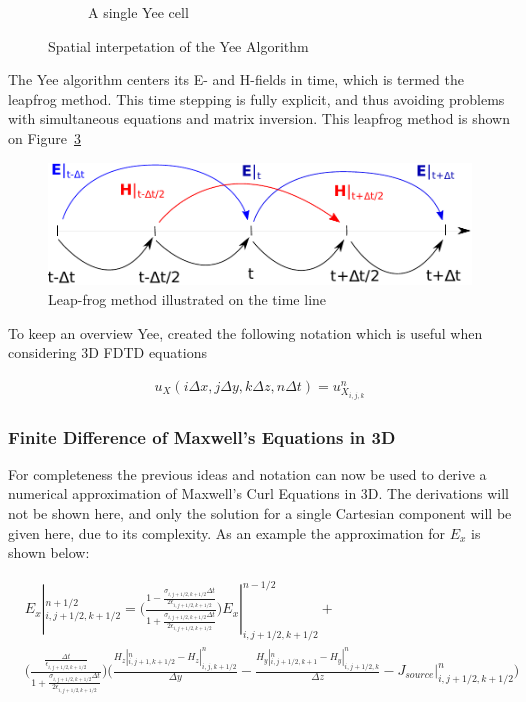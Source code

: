 \begin{figure}
\begin{subfigure}[b]{0.49\textwidth}
        \caption{A single Yee cell}
        \label{fig:yee-cell}
    \end{subfigure}
    \caption{Spatial interpetation of the Yee Algorithm}
    \label{fig:space-yee-algorithm}
\end{figure}

The Yee algorithm centers its E- and H-fields in time, which is termed the leapfrog method. This time stepping is fully explicit, and thus avoiding problems with simultaneous equations and matrix inversion. This leapfrog method is shown on Figure~\ref{fig:leap_frog} 

\begin{figure}[htbp]
    \centering
    \includegraphics[scale=0.7]{img/analysis/leap_frog}
    \caption{Leap-frog method illustrated on the time line}
    \label{fig:leap_frog}
\end{figure}

To keep an overview Yee, created the following notation which is useful when considering 3D FDTD equations

\begin{align}
  u_X (i \Delta x , j \Delta y, k \Delta z, n \Delta t) = u^n_{X_{i,j,k}}
\end{align}

\subsubsection{Finite Difference of Maxwell's Equations in 3D}
For completeness the previous ideas and notation can now be used to derive a numerical approximation of Maxwell's Curl Equations in 3D. The derivations will not be shown here, and only the solution for a single Cartesian component will be given here, due to its complexity. As an example the approximation for $E_x$ is shown below: 

\begin{align}
  &E_x |^{n+1/2}_{i,j+1/2,k+1/2} = \big( \frac{1-\frac{\sigma_{i,j+1/2,k+1/2} \Delta t}{2\epsilon_{i,j+1/2,k+1/2}}}{1+\frac{\sigma_{i,j+1/2,k+1/2} \Delta t}{2\epsilon_{i,j+1/2,k+1/2}}} \big) E_x |^{n-1/2}_{i,j+1/2,k+1/2}  + \\ &\big(  \frac{\frac{\Delta t}{\epsilon_{i,j+1/2,k+1/2}}}{1+\frac{\sigma_{i,j+1/2,k+1/2} \Delta t}{2\epsilon_{i,j+1/2,k+1/2}} }    \big) \big( \frac{H_z |^n_{i,j+1,k+1/2} - H_z |^n_{i,j,k+1/2} }{\Delta y} - \frac{H_y |^n_{i,j+1/2,k+1} - H_y |^n_{i,j+1/2,k} }{\Delta z} -J_{source}|^n_{i,j+1/2,k+1/2}  \big)
\end{align}

